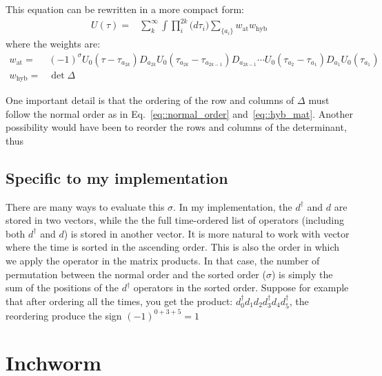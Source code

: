 \documentclass[10pt,letter]{article}
\begin{document}
This equation can be rewritten in a more compact form:
\begin{align}
U(\tau)=& 
\sum_k^{\infty} \int \prod_i^{2k} \Big( d \tau_{i} \Big)  \sum_{\{a_i\}} 
w_{\mathrm{at}} w_{\mathrm{hyb}}
\end{align}
%
%
where the weights are:
\begin{align}
w_{\mathrm{at}} =&
 (-1)^\sigma 
U_0(\tau-\tau_{a_{2k}}) D_{a_{2k}}
U_0(\tau_{a_{2k}}-\tau_{a_{2k-1}}) D_{a_{2k-1}}
\cdots 
U_0(\tau_{a_2}-\tau_{a_1}) D_{a_1}
U_0(\tau_{a_{1}})
\\
w_{\mathrm{hyb}} =&
\operatorname{det} \Delta
\label{eq::ordered_order}
\end{align}


One important detail is that the ordering of the row and columns of $\Delta$ must follow the normal order as in Eq.~\eqref{eq::normal_order} and~\eqref{eq::hyb_mat}. Another possibility would have been to reorder the rows and columns of the determinant, thus 









\subsection{Specific to my implementation}
There are many ways to evaluate this $\sigma$. In my implementation, the $d^\dagger$ and $d$ are stored in two vectors, while the the full time-ordered list of operators (including both  $d^\dagger$ and $d$) is stored in another vector. It is more natural to work with vector where the time is sorted in the ascending order. This is also the order in which we apply the operator in the matrix products. In that case, the number of permutation between the normal order and the sorted order ($\sigma$) is simply the sum of the positions of the $d^\dagger$ operators in the sorted order. Suppose for example that after ordering all the times, you get the product: $d^\dagger_0 d_1 d_2 d_3^\dagger d_4 d_5^\dagger$, the reordering produce the sign $(-1)^{0+3+5}=1$




\section{Inchworm}
\end{document}
